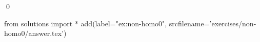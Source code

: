 
\begin{ex} 
  \label{ex:non-homo0}
  
  \qed
\end{ex} 
\begin{python0}
from solutions import *
add(label="ex:non-homo0",
    srcfilename='exercises/non-homo0/answer.tex') 
\end{python0}
